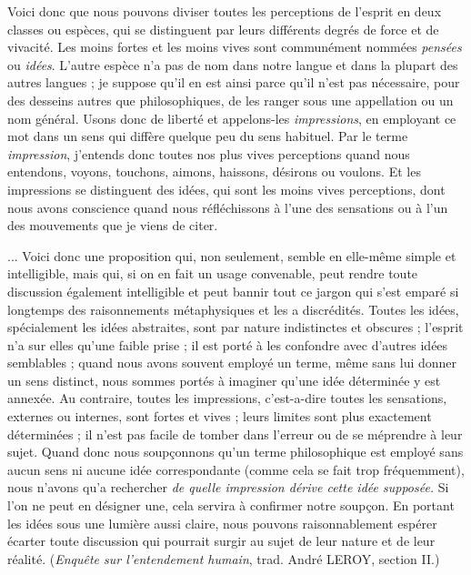 Voici donc que nous pouvons diviser toutes les perceptions
de l’esprit en deux classes ou espèces, qui se distinguent
par leurs différents degrés de force et de vivacité.
Les moins fortes et les moins vives sont communément
nommées {\it pensées} ou {\it idées}. L’autre espèce n’a pas de nom
dans notre langue et dans la plupart des autres langues ;
je suppose qu’il en est ainsi parce qu’il n’est pas nécessaire,
pour des desseins autres que philosophiques, de
les ranger sous une appellation ou un nom général. Usons
donc de liberté et appelons-les {\it impressions}, en employant
ce mot dans un sens qui diffère quelque peu du sens
habituel. Par le terme {\it impression}, j’entends donc toutes
nos plus vives perceptions quand nous entendons, voyons,
touchons, aimons, haissons, désirons ou voulons. Et les
impressions se distinguent des idées, qui sont les moins
vives perceptions, dont nous avons conscience quand
nous réfléchissons à l’une des sensations ou à l’un des
mouvements que je viens de citer.

... Voici donc une proposition qui, non seulement,
semble en elle-même simple et intelligible, mais qui, si
on en fait un usage convenable, peut rendre toute discussion
également intelligible et peut bannir tout ce
jargon qui s’est emparé si longtemps des raisonnements
métaphysiques et les a discrédités. Toutes les idées, spécialement
les idées abstraites, sont par nature indistinctes
et obscures ; l’esprit n’a sur elles qu’une faible prise ;
il est porté à les confondre avec d’autres idées semblables ;
quand nous avons souvent employé un terme, même sans
lui donner un sens distinct, nous sommes portés à imaginer
qu’une idée déterminée y est annexée. Au contraire,
toutes les impressions, c’est-a-dire toutes les sensations,
externes ou internes, sont fortes et vives ; leurs limites
sont plus exactement déterminées ; il n’est pas facile de
tomber dans l’erreur ou de se méprendre à leur sujet.
Quand donc nous soupçonnons qu’un terme philosophique
est employé sans aucun sens ni aucune idée correspondante
(comme cela se fait trop fréquemment), nous n’avons
qu’a rechercher {\it de quelle impression dérive cette idée supposée.}
Si l’on ne peut en désigner une, cela servira à confirmer
notre soupçon. En portant les idées sous une lumière
aussi claire, nous pouvons raisonnablement espérer
écarter toute discussion qui pourrait surgir au sujet de
leur nature et de leur réalité. ({\it Enquête sur l’entendement
humain}, trad. André L{\footnotesize EROY}, section II.)

